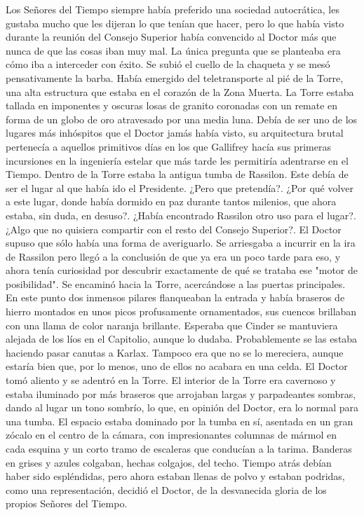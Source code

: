 Los Señores del Tiempo siempre había preferido una sociedad autocrática, les gustaba mucho que les dijeran lo que tenían que hacer, pero lo que había visto durante la reunión del Consejo Superior había convencido al Doctor más que nunca de que las cosas iban muy mal. La única pregunta que se planteaba era cómo iba a interceder con éxito. 
Se subió el cuello de la chaqueta y se mesó pensativamente la barba. Había emergido del teletransporte al pié de la Torre, una alta estructura que estaba en el corazón de la Zona Muerta. La Torre estaba tallada en imponentes y oscuras losas de granito coronadas con un remate en forma de un globo de oro atravesado por una media luna. Debía de ser uno de los lugares más inhóspitos que el Doctor jamás había visto, su arquitectura brutal pertenecía a aquellos primitivos días en los que Gallifrey hacía sus primeras incursiones en la ingeniería estelar que más tarde les permitiría adentrarse en el Tiempo. Dentro de la Torre estaba la antigua tumba de Rassilon. 
Este debía de ser el lugar al que había ido el Presidente. ¿Pero que pretendía?. ¿Por qué volver a este lugar, donde había dormido en paz durante tantos milenios, que ahora estaba, sin duda, en desuso?. ¿Había encontrado Rassilon otro uso para el lugar?. ¿Algo que no quisiera compartir con el resto del Consejo Superior?. 
El Doctor supuso que sólo había una forma de averiguarlo. Se arriesgaba a incurrir en la ira de Rassilon pero llegó a la conclusión de que ya era un poco tarde para eso, y ahora tenía curiosidad por descubrir exactamente de qué se trataba ese "motor de posibilidad". 
Se encaminó hacia la Torre, acercándose a las puertas principales. En este punto dos inmensos pilares flanqueaban la entrada y había braseros de hierro montados en unos picos profusamente ornamentados, sus cuencos brillaban con una llama de color naranja brillante. 
Esperaba que Cinder se mantuviera alejada de los líos en el Capitolio, aunque lo dudaba. Probablemente se las estaba haciendo pasar canutas a Karlax. Tampoco era que no se lo mereciera, aunque estaría bien que, por lo menos, uno de ellos no acabara en una celda. 
El Doctor tomó aliento y se adentró en la Torre. 
El interior de la Torre era cavernoso y estaba iluminado por más braseros que arrojaban largas y parpadeantes sombras, dando al lugar un tono sombrío, lo que, en opinión del Doctor, era lo normal para una tumba. 
El espacio estaba dominado por la tumba en sí, asentada en un gran zócalo en el centro de la cámara, con impresionantes columnas de mármol en cada esquina y un corto tramo de escaleras que conducían a la tarima. Banderas en grises y azules colgaban, hechas colgajos, del techo. Tiempo atrás debían haber sido espléndidas, pero ahora estaban llenas de polvo y estaban podridas, como una representación, decidió el Doctor, de la desvanecida gloria de los propios Señores del Tiempo. 
